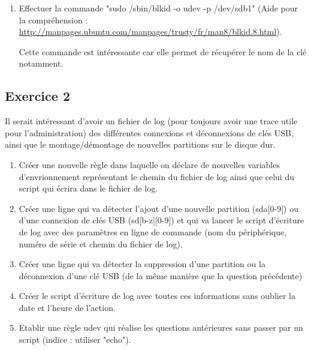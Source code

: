 \documentclass[11pt]{article}
\begin{document}
\begin{enumerate}
	
	\item Effectuer la commande "sudo /sbin/blkid -o udev -p /dev/sdb1" (Aide pour la compréhension : \url{http://manpages.ubuntu.com/manpages/trusty/fr/man8/blkid.8.html}).
	
	 \bigskip
	
	Cette commande est intéressante car elle permet de récupérer le nom de la clé notamment. 
	
\end{enumerate}

\subsection*{Exercice 2}

Il serait intéressant d'avoir un fichier de log (pour toujours avoir une trace utile pour l'administration) 
des différentes connexions et déconnexions de clés USB, ainsi que le montage/démontage de nouvelles partitions
sur le disque dur. 

\begin{enumerate}
	\item Créer une nouvelle règle dans laquelle on déclare de nouvelles variables d'envrionnement représentant le 
	chemin du fichier de log ainsi que celui du script qui écrira dans le fichier de log. 
	\item Créer une ligne qui va détecter l'ajout d'une nouvelle partition (sda[0-9]) ou d'une connexion de clés USB (sd[b-z][0-9])
	et qui va lancer le script d'écriture de log avec des paramètres en ligne de commande (nom du périphérique, numéro de série et chemin du fichier de log).
	\item Créer une ligne qui va détecter la suppression d'une partition ou la déconnexion d'une clé USB (de la même manière que la question précédente)
	
	 \bigskip
	
	\item Créer le script d'écriture de log avec toutes ces informations sans oublier la date et l'heure de l'action.
	
	 \bigskip
	
	\item Etablir une règle udev qui réalise les questions antérieures sans passer par un script (indice : utiliser "echo").
	
	 \bigskip

\end{enumerate}
\end{document}
